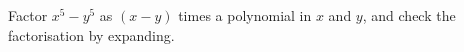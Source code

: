 Factor $x^5-y^5$ as $(x-y)$ times a polynomial in $x$ and $y$, and check the factorisation by expanding.
